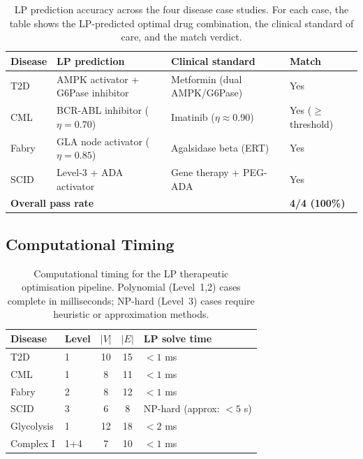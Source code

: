 \begin{table}[!htbp]
\centering
\caption{LP prediction accuracy across the four disease case studies.  For
each case, the table shows the LP-predicted optimal drug combination, the
clinical standard of care, and the match verdict.}
\label{tab:prediction-accuracy}
\begin{tabular}{@{}lp{3.2cm}p{3.2cm}l@{}}
\toprule
Disease & LP prediction & Clinical standard & Match \\
\midrule
T2D & AMPK activator + G6Pase inhibitor & Metformin (dual AMPK/G6Pase) & Yes \\
CML & BCR-ABL inhibitor ($\eta = 0.70$) & Imatinib ($\eta \approx 0.90$) & Yes ($\geq$ threshold) \\
Fabry & GLA node activator ($\eta = 0.85$) & Agalsidase beta (ERT) & Yes \\
SCID & Level-3 + ADA activator & Gene therapy + PEG-ADA & Yes \\
\midrule
\multicolumn{3}{l}{\textbf{Overall pass rate}} & \textbf{4/4 (100\%)} \\
\bottomrule
\end{tabular}
\end{table}

\subsection{Computational Timing}

\begin{table}[!htbp]
\centering
\caption{Computational timing for the LP therapeutic optimisation pipeline.
Polynomial (Level~1,2) cases complete in milliseconds; NP-hard (Level~3) cases
require heuristic or approximation methods.}
\label{tab:timing}
\begin{tabular}{@{}llccl@{}}
\toprule
Disease & Level & $|V|$ & $|E|$ & LP solve time \\
\midrule
T2D     & 1     & 10     & 15    & $< 1$ ms \\
CML     & 1     & 8      & 11    & $< 1$ ms \\
Fabry   & 2     & 8      & 12    & $< 1$ ms \\
SCID    & 3     & 6      & 8     & NP-hard (approx: $< 5$ s) \\
Glycolysis & 1  & 12     & 18    & $< 2$ ms \\
Complex I  & 1+4 & 7     & 10    & $< 1$ ms \\
\bottomrule
\end{tabular}
\end{table}

